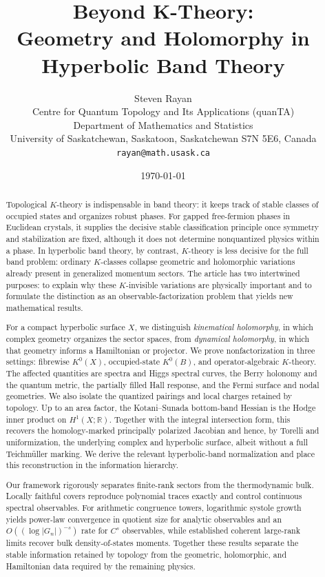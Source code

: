 \documentclass[11pt]{article}
\title{\bfseries Beyond K-Theory:\\
Geometry and Holomorphy in Hyperbolic Band Theory}
\author{
Steven Rayan\\[0.35em]
\small Centre for Quantum Topology and Its Applications (quanTA)\\
\small Department of Mathematics and Statistics\\
\small University of Saskatchewan, Saskatoon, Saskatchewan S7N 5E6, Canada\\
\small \texttt{rayan@math.usask.ca}
}
\date{\today}
\theoremstyle{definition}
\theoremstyle{remark}
\newcommand{\RR}{\mathbb R}
\begin{document}
\maketitle

\begin{abstract}
Topological \(K\)-theory is indispensable in band theory: it keeps track of
stable classes of occupied states and organizes robust phases.  For gapped
free-fermion phases in Euclidean crystals, it supplies the decisive stable
classification principle once symmetry and stabilization are fixed, although
it does not determine nonquantized physics within a phase.  In hyperbolic band
theory, by contrast, \(K\)-theory is less decisive for the full band problem: ordinary
\(K\)-classes collapse geometric and holomorphic variations already present in
generalized momentum sectors. The article has two intertwined purposes: to
explain why these \(K\)-invisible variations are physically important and to
formulate the distinction as an observable-factorization problem that yields new
mathematical results.

For a compact hyperbolic surface \(X\), we distinguish \emph{kinematical
holomorphy}, in which complex geometry organizes the sector spaces, from
\emph{dynamical holomorphy}, in which that geometry informs a Hamiltonian or
projector. We prove nonfactorization in three settings:
fibrewise \(K^0(X)\), occupied-state \(K^0(B)\), and operator-algebraic \(K\)-theory.
The affected quantities are spectra and Higgs spectral curves, the Berry holonomy and the quantum
metric, the partially filled Hall response, and the Fermi surface and nodal geometries.
We also isolate the quantized pairings and local charges retained by topology.
Up to an area factor, the Kotani--Sunada bottom-band Hessian is the Hodge
inner product on \(H^1(X;\RR)\).  Together with the integral intersection
form, this recovers the homology-marked principally polarized Jacobian and hence, by Torelli and
uniformization, the underlying complex and hyperbolic surface, albeit without a
full Teichm\"uller marking.  We derive the relevant hyperbolic-band
normalization and place this reconstruction in the information hierarchy.

Our framework rigorously separates finite-rank sectors from the
thermodynamic bulk.  Locally faithful covers reproduce polynomial traces
exactly and control continuous spectral observables.  For arithmetic
congruence towers, logarithmic systole growth yields power-law convergence in
quotient size for analytic observables and an \(O((\log |G_n|)^{-s})\) rate
for \(C^s\) observables, while established coherent large-rank limits recover
bulk density-of-states moments.  Together these results separate the stable
information retained by topology from the geometric, holomorphic, and
Hamiltonian data required by the remaining physics.
\end{abstract}
\end{document}
